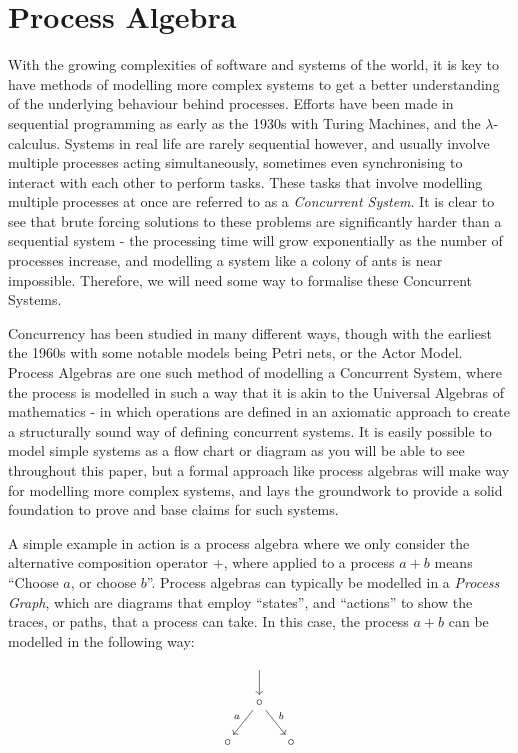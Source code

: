 \documentclass[../hons_project.tex]{subfiles}
\begin{document}
\section{Process Algebra}
With the growing complexities of software and systems of the world, it is key to have methods of modelling more complex systems to get a better understanding of the underlying behaviour behind processes. Efforts have been made in sequential programming as early as the 1930s with Turing Machines, and the $\lambda$-calculus. Systems in real life are rarely sequential however, and usually involve multiple processes acting simultaneously, sometimes even synchronising to interact with each other to perform tasks. These tasks that involve modelling multiple processes at once are referred to as a \textit{Concurrent System}. It is clear to see that brute forcing solutions to these problems are significantly harder than a sequential system - the processing time will grow exponentially as the number of processes increase, and modelling a system like a colony of ants is near impossible. Therefore, we will need some way to formalise these Concurrent Systems.

Concurrency has been studied in many different ways, though with the earliest  the 1960s with some notable models being Petri nets, or the Actor Model. Process Algebras are one such method of modelling a Concurrent System, where the process is modelled in such a way that it is akin to the Universal Algebras of mathematics - in which operations are defined in an axiomatic approach to create a structurally sound way of defining concurrent systems. \citep{baetenBriefHistoryProcess2005} It is easily possible to model simple systems as a flow chart or diagram as you will be able to see throughout this paper, but a formal approach like process algebras will make way for modelling more complex systems, and lays the groundwork to provide a solid foundation to prove and base claims for such systems.

A simple example in action is a process algebra where we only consider the alternative composition operator $+$, where applied to a process $a + b$ means ``Choose $a$, or choose $b$''. Process algebras can typically be modelled in a \textit{Process Graph}, which are diagrams that employ ``states'', and ``actions'' to show the traces, or paths, that a process can take. In this case, the process $a + b$ can be modelled in the following way:

\[\begin{tikzcd}[cramped,column sep=small]
	& {} \\
	& \circ \\
	\circ && \circ \\
	\arrow[from=1-2, to=2-2]
	\arrow["a"', from=2-2, to=3-1]
	\arrow["b", from=2-2, to=3-3]
\end{tikzcd}\]
\end{document}
